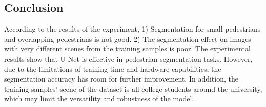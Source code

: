 \documentclass[12pt, a4paper]{article}
\begin{document}
\begin{multicols}{2}
	\section{Conclusion} \justify
	According to the results of the experiment, 1) Segmentation for small pedestrians and overlapping pedestrians is not good. 2) The segmentation effect on images with very different scenes from the training samples is poor. The experimental results show that U-Net is effective in pedestrian segmentation tasks. However, due to the limitations of training time and hardware capabilities, the segmentation accuracy has room for further improvement. In addition, the training samples' scene of the dataset is all college students around the university, which may limit the versatility and robustness of the model.

	\newpage
	
	  
	
	\let\oldthebibliography\thebibliography
	\let\endoldthebibliography\endthebibliography
	\renewenvironment{thebibliography}[1]
		{
	 	 \begin{oldthebibliography}{#1}
	    \setlength{\itemsep}{10.0em}
	    \setlength{\parskip}{10em}
		}{  \end{oldthebibliography} 
		}

	\end{multicols}
\end{document}
